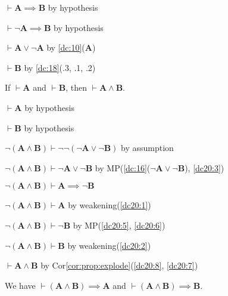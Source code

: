 \documentclass{amsart}%
\newcommand\metavariable[1]{\boldsymbol{#1}}
\begin{document}
\begin{pf}
\item $\vdash\metavariable{A}\implies\metavariable{B}$ by hypothesis
\item $\vdash\neg\metavariable{A}\implies\metavariable{B}$ by hypothesis
\item $\vdash\metavariable{A}\lor\neg\metavariable{A}$ by \ref{dc:10}($\metavariable{A}$)
\item $\vdash\metavariable{B}$ by \ref{dc:18}(.3, .1, .2)
\end{pf}


\begin{dc}\label{dc:20}
If $\vdash\metavariable{A}$ and $\vdash\metavariable{B}$,
then $\vdash\metavariable{A}\land\metavariable{B}$.
\end{dc}

\begin{pf}
\item\label{dc20:1} $\vdash\metavariable{A}$ by hypothesis
\item\label{dc20:2} $\vdash\metavariable{B}$ by hypothesis
\item\label{dc20:3} $\neg(\metavariable{A}\land\metavariable{B})\vdash\neg\neg(\neg\metavariable{A}\lor\neg\metavariable{B})$
  by assumption
\item\label{dc20:4} $\neg(\metavariable{A}\land\metavariable{B})\vdash\neg\metavariable{A}\lor\neg\metavariable{B}$
  by MP(\ref{dc:16}($\neg\metavariable{A}\lor\neg\metavariable{B}$), \ref{dc20:3})
\item\label{dc20:5} $\neg(\metavariable{A}\land\metavariable{B})\vdash\metavariable{A}\implies\neg\metavariable{B}$
\item\label{dc20:6} $\neg(\metavariable{A}\land\metavariable{B})\vdash\metavariable{A}$
  by weakening(\ref{dc20:1})
\item\label{dc20:7} $\neg(\metavariable{A}\land\metavariable{B})\vdash\neg\metavariable{B}$
  by MP(\ref{dc20:5}, \ref{dc20:6})
\item\label{dc20:8} $\neg(\metavariable{A}\land\metavariable{B})\vdash\metavariable{B}$
  by weakening(\ref{dc20:2})
\item\label{dc20:9} $\vdash\metavariable{A}\land\metavariable{B}$
  by Cor\ref{cor:prop:explode}(\ref{dc20:8}, \ref{dc20:7})
\end{pf}

\begin{dc}\label{dc:21}
We have $\vdash(\metavariable{A}\land\metavariable{B})\implies\metavariable{A}$
and $\vdash(\metavariable{A}\land\metavariable{B})\implies\metavariable{B}$.
\end{dc}
\end{document}
